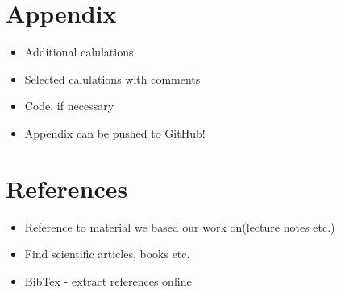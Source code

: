 \documentclass[12pt]{article}
\begin{document}
\section{Appendix}

\begin{itemize}
\item Additional calulations
\item Selected calulations with comments
\item Code, if necessary
\item Appendix can be pushed to GitHub!
\end{itemize}

\section{References}

\begin{itemize}
\item Reference to material we based our work on(lecture notes etc.)
\item Find scientific articles, books etc.
\item BibTex - extract references online
\end{itemize}
\end{document}

